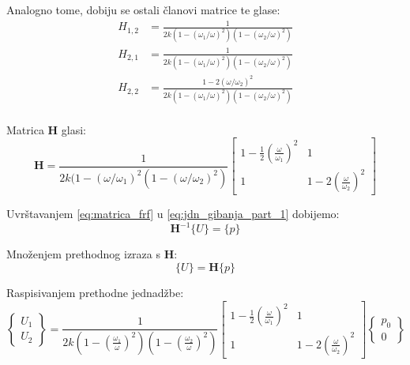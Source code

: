 \documentclass{rgn}
\newcommand\ffrac[2]{\frac{\displaystyle #1}{\displaystyle #2}}
\begin{document}
Analogno tome, dobiju se ostali članovi matrice te glase:
\begin{align}
    H_{1,2} &= \frac{1}{2k(1-(\omega_1/\omega)^2)(1-(\omega_2/\omega)^2)}\label{eq:frf_12}\\
    H_{2,1} &= \frac{1}{2k(1-(\omega_1/\omega)^2)(1-(\omega_2/\omega)^2)}\label{eq:frf_21}\\
    H_{2,2} &= \frac{1-2(\omega/\omega_2)^2}{2k(1-(\omega_1/\omega)^2)(1-(\omega_2/\omega)^2)}\label{eq:frf_22}\\
\end{align}

Matrica $\mathbf{H}$ glasi:
\begin{equation}\label{eq:matrica_frf}
    \mathbf{H}=\frac{1}{2k(1-(\omega/\omega_1)^2(1-(\omega/\omega_2)^2)}
    \begin{bmatrix}
        1-\ffrac{1}{2}\left(\ffrac{\omega}{\omega_1}\right)^2 & 1 \\
        1 & 1-2\left(\ffrac{\omega}{\omega_2}\right)^2
    \end{bmatrix}
\end{equation}

Uvrštavanjem \eqref{eq:matrica_frf} u \eqref{eq:jdn_gibanja_part_1} dobijemo:
\begin{equation}
    \mathbf{H}^{-1}\{U\}=\{p\}
\end{equation}

Množenjem prethodnog izraza s $\mathbf{H}$:
\begin{equation}
    \{U\} = \mathbf{H}\{p\}
\end{equation}

Raspisivanjem prethodne jednadžbe:
\begin{equation}
    \begin{Bmatrix}
        U_1\\
        U_2
    \end{Bmatrix}
    =
    \frac{1}{2k\left(1-\left(\ffrac{\omega_1}{\omega}\right)^2\right)\left(1-\left(\ffrac{\omega_2}{\omega}\right)^2\right)}
    \begin{bmatrix}
        1-\ffrac{1}{2}\left(\ffrac{\omega}{\omega_1}\right)^2 & 1 \\
        1 & 1-2\left(\ffrac{\omega}{\omega_2}\right)^2
    \end{bmatrix}
    \begin{Bmatrix}
        p_0\\
        0
    \end{Bmatrix}
\end{equation}
\end{document}

